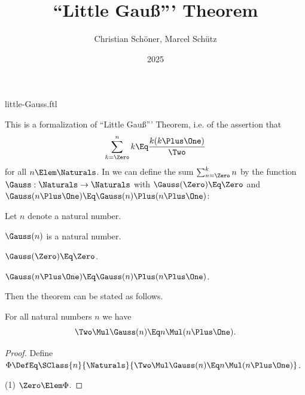 \documentclass{stex}
\title{``Little Gauß''' Theorem}
\author{Christian Schöner, Marcel Schütz}
\date{2025}
\begin{document}
\begin{smodule}{little-Gauss.ftl}




\maketitle

\noindent This is a formalization of ``Little Gauß''' Theorem, i.e. of
the assertion that
\[\sum_{k = \Zero}^n k \Eq \frac{k(k \Plus \One)}\Two\]
for all $n \Elem \Naturals$.
In \Naproche we can define the sum $\sum_{n = \Zero}^k n$ by the function
$\Gauss : \Naturals \to \Naturals$ with $\Gauss(\Zero) \Eq \Zero$ and
$\Gauss(n \Plus \One) \Eq \Gauss(n) \Plus (n \Plus \One)$:

\begin{forthel}
  Let $n$ denote a natural number.

  \begin{signature*}[for=Gauss]
    $\Gauss(n)$ is a natural number.
  \end{signature*}

  \begin{axiom*}
    $\Gauss(\Zero) \Eq \Zero$.
  \end{axiom*}

  \begin{axiom*}
    $\Gauss(n \Plus \One) \Eq \Gauss(n) \Plus (n \Plus \One)$.
  \end{axiom*}
\end{forthel}

\noindent Then the theorem can be stated as follows.

\begin{forthel}
  \begin{theorem*}[title=Little Gauß,name=Little Gauss]
    For all natural numbers $n$ we have
    \[\Two \Mul \Gauss(n) \Eq n \Mul (n \Plus \One).\]
  \end{theorem*}
  \begin{proof}
    Define $\Phi \DefEq \SClass{n}{\Naturals}{\Two \Mul \Gauss(n) \Eq n \Mul (n \Plus \One)}$.
    
    (1) $\Zero \Elem \Phi$.


\end{proof}
\end{forthel}
\end{smodule}
\end{document}
